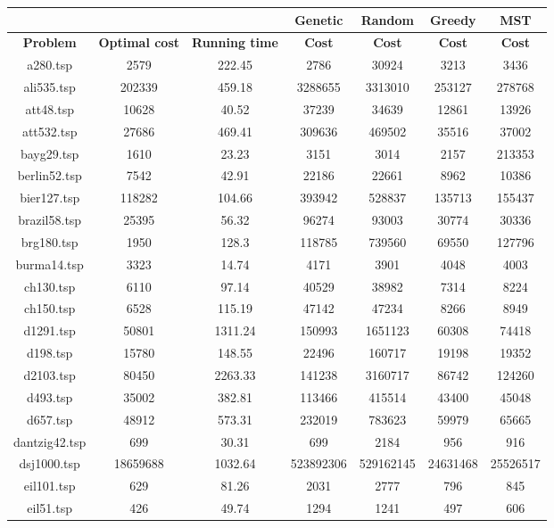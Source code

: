 \documentclass[11pt, english]{article}
\begin{document}
\begin{table}[H]
	\centering
	\begin{tabular}{|c|c|c|c|c|c|c|}
		\hline
		 &  &  & \bf Genetic & \bf Random & \bf Greedy & \bf MST \\
		\hline
		\hline
		\bf Problem & \bf Optimal cost & \bf Running time & \bf Cost & \bf Cost & \bf Cost & \bf Cost \\
		\hline
		a280.tsp & 2579 & 222.45 & 2786 & 30924 & 3213 & 3436 \\
		ali535.tsp & 202339 & 459.18 & 3288655 & 3313010 & 253127 & 278768 \\
		att48.tsp & 10628 & 40.52 & 37239 & 34639 & 12861 & 13926 \\
		att532.tsp & 27686 & 469.41 & 309636 & 469502 & 35516 & 37002 \\
		bayg29.tsp & 1610 & 23.23 & 3151 & 3014 & 2157 & 213353 \\
		berlin52.tsp & 7542 & 42.91 & 22186 & 22661 & 8962 & 10386 \\
		bier127.tsp & 118282 & 104.66 & 393942 & 528837 & 135713 & 155437 \\
		brazil58.tsp & 25395 & 56.32 & 96274 & 93003 & 30774 & 30336 \\
		brg180.tsp & 1950 & 128.3 & 118785 & 739560 & 69550 & 127796 \\
		burma14.tsp & 3323 & 14.74 & 4171 & 3901 & 4048 & 4003 \\
		ch130.tsp & 6110 & 97.14 & 40529 & 38982 & 7314 & 8224 \\
		ch150.tsp & 6528 & 115.19 & 47142 & 47234 & 8266 & 8949 \\
		d1291.tsp & 50801 & 1311.24 & 150993 & 1651123 & 60308 & 74418 \\
		d198.tsp & 15780 & 148.55 & 22496 & 160717 & 19198 & 19352 \\
		d2103.tsp & 80450 & 2263.33 & 141238 & 3160717 & 86742 & 124260 \\
		d493.tsp & 35002 & 382.81 & 113466 & 415514 & 43400 & 45048 \\
		d657.tsp & 48912 & 573.31 & 232019 & 783623 & 59979 & 65665 \\
		dantzig42.tsp & 699 & 30.31 & 699 & 2184 & 956 & 916 \\
		dsj1000.tsp & 18659688 & 1032.64 & 523892306 & 529162145 & 24631468 & 25526517 \\
		eil101.tsp & 629 & 81.26 & 2031 & 2777 & 796 & 845 \\
		eil51.tsp & 426 & 49.74 & 1294 & 1241 & 497 & 606 \\

\end{tabular}
\end{table}
\end{document}
